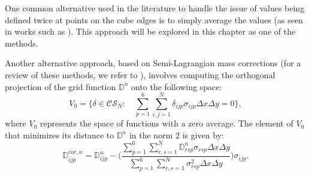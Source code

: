 One common alternative used in the literature to handle the issue of values being defined twice at points on the
cube edges is to simply average the values (as seen in works such as \citet{ross:2006, chen:2008}).
This approach will be explored in this chapter as one of the methods.

Another alternative approach, based on Semi-Lagrangian mass corrections
(for a review of these methods, we refer to \citet{diamantakis:2014}),
involves computing the orthogonal projection of the grid function $\mathbb{D}^n$ onto the following space:
\begin{equation*}
	V_0 = \{ \delta \in \mathcal{CS}_N: \quad
		\sum_{p=1}^6 \sum_{i,j=1}^N \mathbb{\delta}_{ijp} \sigma_{ijp} \Delta x \Delta y = 0\},
\end{equation*}
where $V_0$ represents the space of functions with a zero average.
The element of $V_0$ that minimizes its distance to $\mathbb{D}^n$ in the norm 2 is given by:
\begin{equation*}
\mathbb{D}^{cor,n}_{ijp} = \mathbb{D}^n_{ijp} - \bigg(\frac{	\sum_{p=1}^6 \sum_{r,s=1}^N \mathbb{D}_{rsp}^n \sigma_{rsp} \Delta x \Delta y}
 {\sum_{p=1}^6 \sum_{r,s=1}^N \sigma_{rsp}^2 \Delta x \Delta y}\bigg)\sigma_{ijp}.
\end{equation*}
